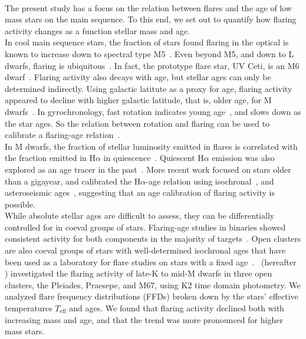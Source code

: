 \documentclass{aa}
\begin{document}
\\
The present study has a focus on the relation between flares and the age of low mass stars on the main sequence. To this end, we set out to quantify how flaring activity changes as a function stellar mass and age. 
\\
In cool main sequence stars, the fraction of stars found flaring in the optical is known to increase down to spectral type M5~\citep{yang_flaring_2017, chang2020}. Even beyond M5, and down to L dwarfs, flaring is ubiquitous~\citep{stelzer2006, robrade2010, gizis2013, schmidt2015, schmidt2016, paudel2018}. In fact, the prototype flare star, UV Ceti, is an M6 dwarf~\citep{kirkpatrick1991}. %
Flaring activity also decays with age, but stellar ages can only be determined indirectly. Using galactic latitute as a proxy for age, flaring activity appeared to decline with higher galactic latitude, that is, older age, for M dwarfs~\citep{hilton2010, walkowicz2011, howard2019}. In gyrochronology, fast rotation indicates young age~\citep{barnes_rotational_2003}, and slows down as the star ages. So the relation between rotation and flaring can be used to calibrate a flaring-age relation~\citep{davenport2019}. 
\\
In M dwarfs, the fraction of stellar luminosity emitted in flares is correlated with the fraction emitted in H$\alpha$ in quiescence~\citep{yang_flaring_2017}. Quiescent H$\alpha$ emission was also explored as an age tracer in the past~\citep{soderblom_chromospheric_1991, pace_chromospheric_2013, lorenzo-oliveira_age-mass-metallicity-activity_2016}. More recent work focused on stars older than a gigayear, and calibrated the H$\alpha$-age relation using isochronal~\citep{lorenzooliveira2018}, and asteroseismic ages~\citep{booth2017, booth2020}, suggesting that an age calibration of flaring activity is possible.%
\\
While absolute stellar ages are difficult to assess, they can be differentially controlled for in coeval groups of stars. Flaring-age studies in binaries showed consistent activity for both components in the majority of targets~\citep{lurie2015, clarke_flare_2018}. Open clusters are also coeval groups of stars with well-determined isochronal ages that have been used as a laboratory for flare studies on stars with a fixed age~\citep{mirzoyan1993, chang2015}. \citet{ilin2019}~(hereafter ) investigated the flaring activity of late-K to mid-M dwarfs in three open clusters, the Pleiades, Praesepe, and M67, using K2 time domain photometry. We analyzed flare frequency distributions (FFDs) broken down by the stars' effective temperatures $T_\mathrm{eff}$ and ages. We found that flaring activity declined both with increasing mass and age, and that the trend was more pronounced for higher mass stars. 
\end{document}
